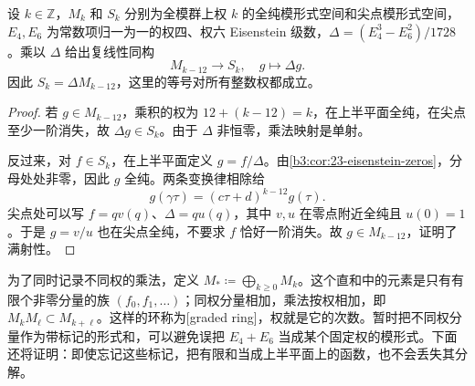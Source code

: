 \begin{proposition}[用判别式降低权]\label{b3:prop:23-cusp-division}
设 \(k\in\mathbb Z\)，\(M_k\) 和 \(S_k\) 分别为全模群上权 \(k\) 的全纯模形式空间和尖点模形式空间，\(E_4,E_6\) 为常数项归一为一的权四、权六 Eisenstein 级数，\(\Delta=(E_4^3-E_6^2)/1728\)。乘以 \(\Delta\) 给出复线性同构
\[
 M_{k-12}\longrightarrow S_k,\quad g\longmapsto\Delta g.
\]
因此 \(S_k=\Delta M_{k-12}\)，这里的等号对所有整数权都成立。
\end{proposition}
\begin{proof}
若 \(g\in M_{k-12}\)，乘积的权为 \(12+(k-12)=k\)，在上半平面全纯，在尖点至少一阶消失，故 \(\Delta g\in S_k\)。由于 \(\Delta\) 非恒零，乘法映射是单射。

反过来，对 \(f\in S_k\)，在上半平面定义 \(g=f/\Delta\)。由\cref{b3:cor:23-eisenstein-zeros}，分母处处非零，因此 \(g\) 全纯。两条变换律相除给
\[
 g(\gamma\tau)=(c\tau+d)^{k-12}g(\tau).
\]
尖点处可以写 \(f=qv(q)\)、\(\Delta=qu(q)\)，其中 \(v,u\) 在零点附近全纯且 \(u(0)=1\)。于是 \(g=v/u\) 也在尖点全纯，不要求 \(f\) 恰好一阶消失。故 \(g\in M_{k-12}\)，证明了满射性。
\end{proof}

为了同时记录不同权的乘法，定义 \(M_*\coloneqq\bigoplus_{k\ge0}M_k\)。这个直和中的元素是只有有限个非零分量的族 \((f_0,f_1,\ldots)\)；同权分量相加，乘法按权相加，即 \(M_kM_\ell\subset M_{k+\ell}\)。这样的环称为[graded ring]，权就是它的次数。暂时把不同权分量作为带标记的形式和，可以避免误把 \(E_4+E_6\) 当成某个固定权的模形式。下面还将证明：即使忘记这些标记，把有限和当成上半平面上的函数，也不会丢失其分解。

